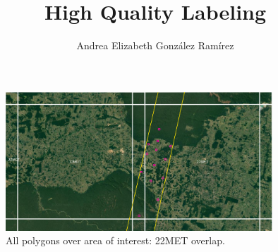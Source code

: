 \documentclass{beamer}
\title{High Quality Labeling}
\author{Andrea Elizabeth González Ramírez}
\begin{document}
\begin{frame}
    \titlepage
    \thispagestyle{empty}
\end{frame}

\section{}
\begin{frame}
    \begin{figure}
        \includegraphics[width=10cm]{Figures/v3/main/overlaping_polygons_1.png}
        \caption{All polygons over area of interest: 22MET overlap.}  
        \centering
    \end{figure}
\end{frame}
\end{document}
